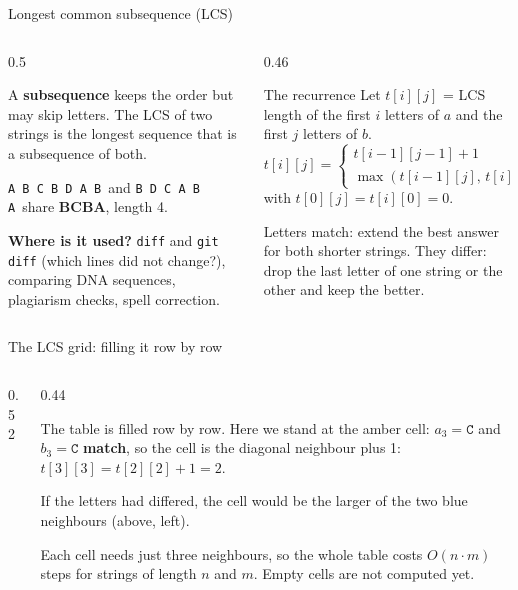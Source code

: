\documentclass[aspectratio=169,10pt]{beamer}
\newcommand{\figtab}[2][0.5]{\begin{sfig}[#1]\end{sfig}}
\begin{document}
\begin{frame}{Longest common subsequence (LCS)}
\begin{columns}[T]
\begin{column}{0.5\textwidth}
{\small
A \textbf{subsequence} keeps the order but may skip letters. The LCS of two strings is the longest sequence that is a subsequence of both.

\vspace{2mm}
\texttt{A\,\textcolor{tdBlue}{B}\,\textcolor{tdBlue}{C}\,\textcolor{tdBlue}{B}\,D\,\textcolor{tdBlue}{A}\,B}\ and \texttt{\textcolor{tdBlue}{B}\,D\,\textcolor{tdBlue}{C}\,A\,\textcolor{tdBlue}{B}\,\textcolor{tdBlue}{A}}\ share \textbf{BCBA}, length 4.

\vspace{2mm}
\textbf{Where is it used?} \texttt{diff} and \texttt{git diff} (which lines did not change?), comparing DNA sequences, plagiarism checks, spell correction.}
\end{column}
\begin{column}{0.46\textwidth}
\begin{block}{The recurrence}
{\small Let $t[i][j]$ = LCS length of the first $i$ letters of $a$ and the first $j$ letters of $b$.
{\footnotesize\[
t[i][j]=\begin{cases}
t[i-1][j-1]+1 & a_i=b_j\\[2pt]
\max(t[i-1][j],\,t[i][j-1]) & \text{else}
\end{cases}\]}
with $t[0][j]=t[i][0]=0$.}
\end{block}
\vspace{1mm}
{\small Letters match: extend the best answer for both shorter strings. They differ: drop the last letter of one string or the other and keep the better.}
\end{column}
\end{columns}
\end{frame}

\begin{frame}{The LCS grid: filling it row by row}
\begin{columns}[T]
\begin{column}{0.52\textwidth}
\figtab[0.78]{fig_lcs1}
\end{column}
\begin{column}{0.44\textwidth}
{\small
The table is filled row by row. Here we stand at the amber cell: $a_3=\texttt C$ and $b_3=\texttt C$ \textbf{match}, so the cell is the \colorbox{tdGreen!35}{diagonal} neighbour plus 1: $t[3][3]=t[2][2]+1=2$.

\vspace{2mm}
If the letters had differed, the cell would be the larger of the two \colorbox{tdBlue!14}{blue} neighbours (above, left).

\vspace{2mm}
Each cell needs just three neighbours, so the whole table costs $O(n\cdot m)$ steps for strings of length $n$ and $m$. Empty cells are not computed yet.}
\end{column}
\end{columns}
\end{frame}
\end{document}
